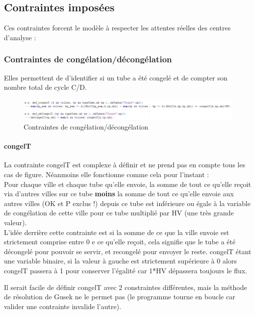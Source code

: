 \documentclass{polytech/polytech}
\numberwithin{figure}{chapter}
\begin{document}
\subsection{Contraintes imposées}

Ces contraintes forcent le modèle à respecter les attentes réelles des centres d'analyse : 

\subsubsection{Contraintes de congélation/décongélation}

Elles permettent de d'identifier si un tube a été congelé et de compter son nombre total de cycle C/D.

\begin{figure}[ht]
    \centering
    \includegraphics[width=\textwidth]{pic/congel.png}
    \caption{Contraintes de congélation/décongélation}
\end{figure}

\paragraph{congelT}

La contrainte congelT est complexe à définir et ne prend pas en compte tous les cas de figure. Néanmoins elle fonctionne comme cela pour l'instant :\\
Pour chaque ville et chaque tube qu'elle envoie, la somme de tout ce qu'elle reçoit via d'autres villes sur ce tube \textbf{moins} la somme de tout ce qu'elle envoie aux autres villes (OK et P exclus !) depuis ce tube est inférieure ou égale à la variable de congélation de cette ville pour ce tube multiplié par HV (une très grande valeur).\\

L'idée derrière cette contrainte est si la somme de ce que la ville envoie est strictement comprise entre 0 e ce qu'elle reçoit, cela signifie que le tube a été décongelé pour pouvoir se servir, et recongelé pour envoyer le reste.
congelT étant une variable binaire, si la valeur à gauche est strictement supérieure à 0 alors congelT passera à 1 pour conserver l'égalité car 1*HV dépassera toujours le flux.

Il serait facile de définir congelT avec 2 constraintes différentes, mais la méthode de résolution de Gusek ne le permet pas (le programme tourne en boucle car valider une contrainte invalide l'autre).
\end{document}
